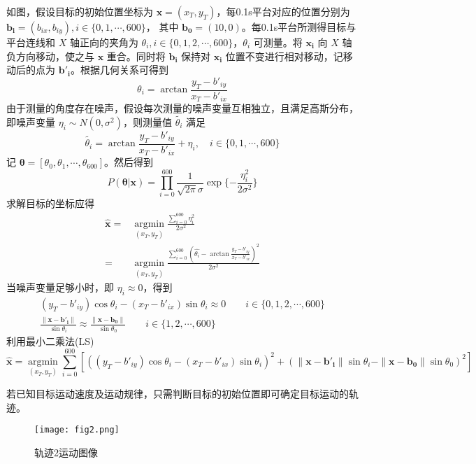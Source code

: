 \documentclass[UTF8]{ctexart}
\begin{document}
如图，假设目标的初始位置坐标为 $\bm{x}=(x_T,y_T)$，每0.1s平台对应的位置分别为 $\bm{b_i}=(b_{ix},b_{iy}), i \in \lbrace 0,1,\cdots,600 \rbrace$，
其中 $\bm{b_0} = (10,0)$。每0.1s平台所测得目标与平台连线和 $X$ 轴正向的夹角为 $\theta_i,i \in \lbrace 0,1,2,\cdots,600 \rbrace$，$\theta_i$ 可测量。将 $\bm{x_i}$ 向 $X$ 轴负方向移动，使之与 $\bm{x}$ 重合。同时将 $\bm{b_i}$
保持对 $\bm{x_i}$ 位置不变进行相对移动，记移动后的点为 $\bm{b'_i}$。根据几何关系可得到
\begin{equation}
    \theta_i = \arctan \frac{y_T-b'_{iy}}{x_T-b'_{ix}}
\end{equation}
由于测量的角度存在噪声，假设每次测量的噪声变量互相独立，且满足高斯分布，即噪声变量 $\eta_i \sim N(0,\sigma^2)$，则测量值 $\tilde{\theta_i}$ 满足
\begin{equation}
    \tilde{\theta_i} = \arctan \frac{y_T-b'_{iy}}{x_T-b'_{ix}} + \eta_i, \quad i \in \lbrace 0,1,\cdots,600 \rbrace
\end{equation}
记 $\bm{\theta} = [\theta_0, \theta_1, \cdots, \theta_{600}]$。然后得到
\begin{equation}
    P(\bm{\theta} | \bm{x}) = \prod\limits_{i = 0}^{600} {\frac{1}{{\sqrt {2\pi } \sigma }}\exp \{  - \frac{{\eta _i^2}}{{2{\sigma ^2}}}\} } 
\end{equation}
求解目标的坐标应得
\begin{equation}
    \begin{split}
        \hat{\bm{x}} =& \mathop {\arg \min }\limits_{({x_T},{y_T})} \frac{\sum\limits_{i=0}^{600} \eta_i^2}{2 \sigma^2} \\
                    =& \mathop {\arg \min}\limits_{(x_T,y_T)} \frac{\sum\limits_{i=0}^{600} (\hat{\theta_i}-\arctan\frac{y_T-b'_{iy}}{x_T-b'_{ix}})^2}{2\sigma^2}
    \end{split}
\end{equation}
当噪声变量足够小时，即 $\eta_i \approx 0$，得到
\begin{equation}
    \begin{split}
    (y_T-b'_{iy})\cos \theta_i - (x_T-b'_{ix})\sin \theta_i \approx 0  \qquad i \in \lbrace 0,1,2,\cdots, 600 \rbrace\\
    \frac{\| \bm{x}-\bm{b'_i}\|}{\sin\theta_i} \approx \frac{\| \bm{x}-\bm{b_0}\|}{\sin\theta_0} \qquad i \in \lbrace 1,2,\cdots,600 \rbrace
    \end{split}
\end{equation}
利用最小二乘法(LS)
\begin{equation}
    \hat{\bm{x}} = \mathop {\arg \min}\limits_{(x_T,y_T)} \sum\limits_{i=0}^{600} [((y_T-b'_{iy})\cos \theta_i - (x_T-b'_{ix})\sin \theta_i)^2 + 
    (\|\bm{x}-\bm{b'_i}\|\sin\theta_i-\|\bm{x}-\bm{b_0}\|\sin\theta_0)^2]
\end{equation}

若已知目标运动速度及运动规律，只需判断目标的初始位置即可确定目标运动的轨迹。


\begin{figure}
    \centering
    \texttt{[image: fig2.png]}
    \caption{轨迹2运动图像}
\end{figure}
\end{document}

